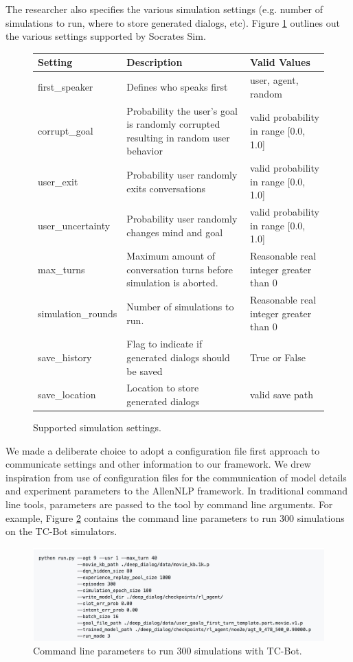 The researcher also specifies the various simulation settings (e.g. number of simulations to run, where to store generated dialogs, etc). Figure \ref{fig:sim_settings} outlines out the various settings supported by Socrates Sim.

\begin{figure}[h!]
	\centering
	 \begin{tabular}{|l|p{5cm}|p{5cm}|}
		\hline 
		\textbf{Setting} &\textbf{ Description } & \textbf{Valid Values } \\ 
		\hline 
		first\_speaker & Defines who speaks first  & user, agent, random  \\ 
		\hline 
		corrupt\_goal & Probability the user's goal is randomly corrupted resulting in random user behavior  & valid probability in range [0.0, 1.0]  \\ 
		\hline 
		user\_exit & Probability user randomly exits conversations  & valid probability in range [0.0, 1.0]  \\ 
		\hline 
		user\_uncertainty & Probability user randomly changes mind and goal  & valid probability in range [0.0, 1.0]  \\ 
		\hline 
		max\_turns & Maximum amount of conversation turns before simulation is aborted.  &  Reasonable real integer greater than 0 \\ 
		\hline 
		simulation\_rounds & Number of simulations to run.  &  Reasonable real integer greater than 0 \\ 
		\hline 
		save\_history & Flag to indicate if generated dialogs should be saved & True or False  \\ 
		\hline 
		save\_location & Location to store generated dialogs  & valid save path  \\ 
		\hline 
	\end{tabular} 
	\caption{ Supported simulation settings.}
	\label{fig:sim_settings}
\end{figure}

We made a deliberate choice to adopt a configuration file first approach to communicate settings and other information to our framework. We drew inspiration from \cite{Gardner_allennlp} use of configuration files for the communication of model details and experiment parameters to the AllenNLP framework. In traditional command line tools, parameters are passed to the tool by command line arguments. For example, Figure \ref{fig:cmd_line_ex} contains the command line parameters to run 300 simulations on the TC-Bot simulators. 

\begin{figure}[h!]
	\centering
	\includegraphics[scale=.25]{diagrams/cmd_line_ex.jpeg}
	\caption{ Command line parameters to run 300 simulations with TC-Bot. }
	\label{fig:cmd_line_ex}
\end{figure}

